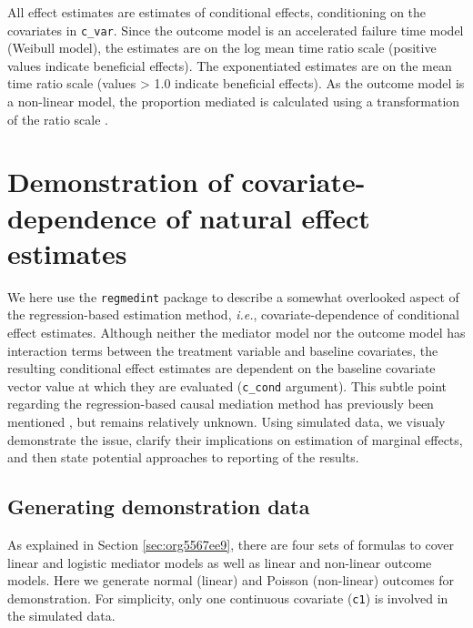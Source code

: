 \documentclass[10pt]{article}
\begin{document}
\normalsize

All effect estimates are estimates of conditional effects, conditioning on the covariates in \texttt{c\_var}. Since the outcome model is an accelerated failure time model (Weibull model), the estimates are on the log mean time ratio scale (positive values indicate beneficial effects). The exponentiated estimates are on the mean time ratio scale (values > 1.0 indicate beneficial effects). As the outcome model is a non-linear model, the proportion mediated is calculated using a transformation of the ratio scale \cite{vanderweeleOddsRatiosMediation2010}.

\section{Demonstration of covariate-dependence of natural effect estimates}
\label{sec:org10f2fac}
We here use the \texttt{regmedint} package to describe a somewhat overlooked aspect of the regression-based estimation method, \textit{i.e.}, covariate-dependence of conditional effect estimates. Although neither the mediator model nor the outcome model has interaction terms between the treatment variable and baseline covariates, the resulting conditional effect estimates are dependent on the baseline covariate vector value at which they are evaluated (\texttt{c\_cond} argument). This subtle point regarding the regression-based causal mediation method has previously been mentioned \cite{steenFlexibleMediationAnalysis2017,starkopfComparisonFiveSoftware2017}, but remains relatively unknown. Using simulated data, we visualy demonstrate the issue, clarify their implications on estimation of marginal effects, and then state potential approaches to reporting of the results.

\subsection{Generating demonstration data}
\label{sec:org6944360}
As explained in Section \ref{sec:org5567ee9}, there are four sets of formulas to cover linear and logistic mediator models as well as linear and non-linear outcome models. Here we generate normal (linear) and Poisson (non-linear) outcomes for demonstration. For simplicity, only one continuous covariate (\texttt{c1}) is involved in the simulated data.
\end{document}

